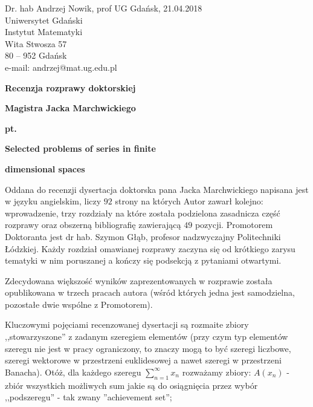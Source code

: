 \documentclass[12pt]{article}
\begin{document}

\begin{flushleft}
Dr. hab Andrzej Nowik, prof UG \hfill Gdańsk, 21.04.2018 \\
Uniwersytet Gdański \\
Instytut Matematyki \\
Wita Stwosza 57 \\
80 -- 952 Gdańsk \\
e-mail: andrzej@mat.ug.edu.pl\\
\end{flushleft}
\vspace{3mm}
\begin{center}{\bf \LARGE
Recenzja rozprawy doktorskiej }
\end{center}
\begin{center}
{\LARGE \bf
Magistra Jacka Marchwickiego
}
\end{center}
\begin{center}
\bf \Large pt.
\end{center}
\begin{center} \LARGE
\bf Selected problems of series in finite
\end{center}

\begin{center} \LARGE
\bf dimensional spaces
\end{center}


  Oddana do recenzji dysertacja doktorska pana Jacka Marchwickiego 
napisana jest w języku angielskim, liczy $92$
strony na których Autor zawarł kolejno: wprowadzenie, trzy
rozdzia\-ły na które została podzielona zasadnicza część rozprawy 
oraz obszerną biblio\-grafię zawie\-ra\-ją\-cą
$49$ pozycji. Promotorem Doktoranta jest dr hab. Szymon Głąb,
profesor nadzwyczajny Politechniki Łódzkiej. Każdy rozdział omawianej rozprawy 
zaczyna się od krótkiego zarysu tematyki w nim poruszanej
a kończy się podsekcją z pytaniami otwartymi.

  Zdecydowana większość wyników zaprezentowanych w rozprawie
została opublikowana w trzech pracach autora (wśród których
jedna jest samodzielna, pozostałe dwie wspólne z Promotorem).

  Kluczowymi pojęciami recenzowanej dysertacji są
rozmaite zbiory ,,stowarzyszone'' z zadanym szeregiem
elementów (przy czym typ elementów szeregu nie jest w pracy ograniczony,
to znaczy mogą to być szeregi liczbowe, szeregi wektorowe w 
przestrzeni euklidesowej a nawet szeregi w przestrzeni Banacha).
  Otóż, dla każdego szeregu $\sum_{n=1}^\infty x_n$
rozważamy zbiory:
$A(x_n)$ - zbiór wszystkich możliwych sum jakie są
do osiągnięcia przez wybór ,,podszeregu'' - tak zwany
''achievement set'';
\end{document}
